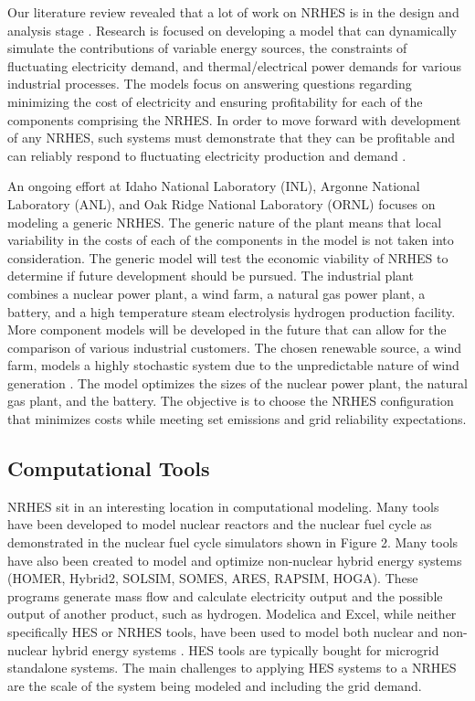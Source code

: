 \documentclass{article}                                                                           %
\begin{document}
\begin{linenumbers}
Our literature review revealed that a lot of work on NRHES is in the design and analysis stage \cite{Boardman2013, Shropshire2012}. Research is focused on developing a model that can dynamically simulate the contributions of variable energy sources, the constraints of fluctuating electricity demand, and thermal/electrical power demands for various industrial processes. The models focus on answering questions regarding minimizing the cost of electricity and ensuring profitability for each of the components comprising the NRHES. In order to move forward with development of any NRHES,  such systems must demonstrate that they can be profitable and can reliably respond to fluctuating electricity production and demand \cite{Rabiti2015}.

An ongoing effort at Idaho National Laboratory (INL), Argonne National Laboratory (ANL), and Oak Ridge National Laboratory (ORNL) focuses on modeling a generic NRHES. The generic nature of the plant means that local variability in the costs of each of the components in the model is not taken into consideration. The generic model will test the economic viability of NRHES to determine if future development should be pursued. The industrial plant combines a nuclear power plant, a wind farm, a natural gas power plant, a battery, and a high temperature steam electrolysis hydrogen production facility. More component models will be developed in the future that can allow for the comparison of various industrial customers\cite{Harrison2016}. The chosen renewable source, a wind farm, models a highly stochastic system due to the unpredictable nature of wind generation \cite{Chen2016_wind}. The model optimizes the sizes of the nuclear power plant, the natural gas plant, and the battery. The objective is to choose the NRHES configuration that minimizes costs while meeting set emissions and grid reliability expectations.


\subsection{Computational Tools}
NRHES sit in an interesting location in computational modeling. Many tools have been developed to model nuclear reactors and the nuclear fuel cycle as demonstrated in the nuclear fuel cycle simulators shown in Figure 2. Many tools have also been created to model and optimize non-nuclear hybrid energy systems (HOMER, Hybrid2, SOLSIM, SOMES, ARES, RAPSIM, HOGA)\cite {Bernal-Agustin2009}. These programs generate mass flow and calculate electricity output and the possible output of another product, such as hydrogen. Modelica and Excel, while neither specifically HES or NRHES tools, have been used to model both nuclear and non-nuclear hybrid energy systems \cite{Shropshire2012, Chen2016, Binder2014, Garcia2015, Epiney2016}. HES tools are typically bought for microgrid standalone systems. The main challenges to applying HES systems to a NRHES are the scale of the system being modeled and including the grid demand.


\end{linenumbers}
\end{document}
